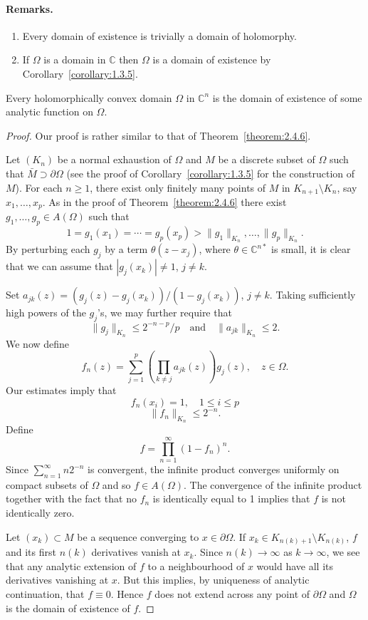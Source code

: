 \paragraph*{Remarks.}
\begin{enumerate}
\item Every domain of existence is trivially a domain of holomorphy.
\item If $\Omega$ is a domain in $\mathbb C$ then $\Omega$ is a domain of existence by Corollary~\ref{corollary:1.3.5}.
\end{enumerate}
 Every holomorphically convex domain $\Omega$ in $\mathbb C^n$ is the domain of existence of some analytic function on $\Omega$.
\begin{proof}
Our proof is rather similar to that of Theorem~\ref{theorem:2.4.6}.

Let $(K_n)$ be a normal exhaustion of $\Omega$ and $M$ be a discrete subset of $\Omega$ such that $\bar M\supset\partial\Omega$ (see the proof of Corollary~\ref{corollary:1.3.5} for the construction of $M$). For each $n\geq1$, there exist only finitely many points of $M$ in $K_{n+1}\setminus K_n$, say $x_1,\ldots,x_p$. As in the proof of Theorem~\ref{theorem:2.4.6} there exist $g_1,\ldots,g_p\in A(\Omega)$ such that
\[1=g_1(x_1)=\cdots=g_p(x_p)>\|g_1\|_{K_n},\ldots,\|g_p\|_{K_n}.\]
By perturbing each $g_j$ by a term $\theta(z-x_j)$, where $\theta\in\mathbb C^{n*}$ is small, it is clear that we can assume that $|g_j(x_k)|\neq1$, $j\neq k$.

Set $a_{jk}(z)=(g_j(z)-g_j(x_k))/(1-g_j(x_k))$, $j\neq k$. Taking sufficiently high powers of the $g_j$'s, we may further require that
\[\|g_j\|_{K_n}\leq2^{-n-p}/p\quad\text{and}\quad\|a_{jk}\|_{K_n}\leq2.\]
We now define
\[f_n(z)=\sum_{j=1}^p\left(\prod_{k\neq j}a_{jk}(z)\right)g_j(z),\quad z\in\Omega.\]
Our estimates imply that
\[f_n(x_i)=1,\quad1\leq i\leq p\]
\[\|f_n\|_{K_n}\leq2^{-n}.\]
Define
\[f=\prod_{n=1}^\infty(1-f_n)^n.\]
Since $\sum_{n=1}^\infty n2^{-n}$ is convergent, the infinite product converges uniformly on compact subsets of $\Omega$ and so $f\in A(\Omega)$. The convergence of the infinite product together with the fact that no $f_n$ is identically equal to 1 implies that $f$ is not identically zero.

Let $(x_k)\subset M$ be a sequence converging to $x\in\partial\Omega$. If $x_k\in K_{n(k)+1}\setminus K_{n(k)}$, $f$ and its first $n(k)$ derivatives vanish at $x_k$. Since $n(k)\to\infty$ as $k\to\infty$, we see that any analytic extension of $f$ to a neighbourhood of $x$ would have all its derivatives vanishing at $x$. But this implies, by uniqueness of analytic continuation, that $f\equiv0$. Hence $f$ does not extend across any point of $\partial\Omega$ and $\Omega$ is the domain of existence of $f$.
\end{proof}
